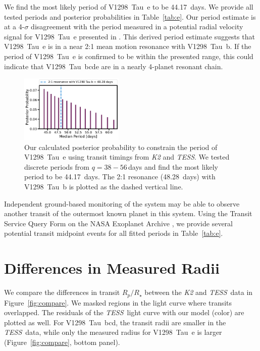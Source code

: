 \documentclass[twocolumn]{aastex631}
\newcommand{\githubicon}{{\color{black}\faGithub}}
\newcommand{\tess}{\textit{TESS}}
\newcommand{\allplanets}{V1298~Tau~bcde\xspace}
\newcommand{\planetb}{V1298~Tau~b\xspace}
\newcommand{\planete}{V1298~Tau~e\xspace}
\newcommand{\planetknown}{V1298~Tau~bcd\xspace}
\begin{document}
We find the most likely period of \planete to be 44.17~days. We provide all tested periods and posterior probabilities in Table~\ref{tab:e}. Our period estimate is at a 4-$\sigma$ disagreement with the period measured in a potential radial velocity signal for \planete presented in \cite{suarez21}. This derived period estimate suggests that \planete is in a near 2:1 mean motion resonance with \planetb. If the period of \planete is confirmed to be within the presented range, this could indicate that \allplanets are in a nearly 4-planet resonant chain.

\begin{figure}[h]
\begin{center}
\includegraphics[width=0.44\textwidth,trim={0.25cm 0 0cm 0}]{static/periode.pdf}
\caption{Our calculated posterior probability to constrain the period of \planete using transit timings from \textit{K2} and \tess. We tested discrete periods from $q=38-56$\,days and find the most likely period to be 44.17~days. The 2:1 resonance (48.28~days) with \planetb is plotted as the dashed vertical line. \href{https://github.com/afeinstein20/v1298tau\_tess/blob/main/src/figures/period\_e.py}{\githubicon}} \label{fig:period_e}
\end{center}
\end{figure}

Independent ground-based monitoring of the system may be able to observe another transit of the outermost known planet in this system. Using the Transit Service Query Form on the NASA Exoplanet Archive \citep{Akeson2013}, we provide several potential transit midpoint events for all fitted periods in Table~\ref{tab:e}.

\section{Differences in Measured Radii} \label{sec:radii}

We compare the differences in transit $R_p/R_\star$ between the \textit{K2} and \tess\ data in Figure~\ref{fig:compare}. We masked regions in the light curve where transits overlapped. The residuals of the \tess\ light curve with our model (color) are plotted as well. For \planetknown, the transit radii are smaller in the \tess\ data, while only the measured radius for \planete is larger (Figure~\ref{fig:compare}, bottom panel).
\end{document}
